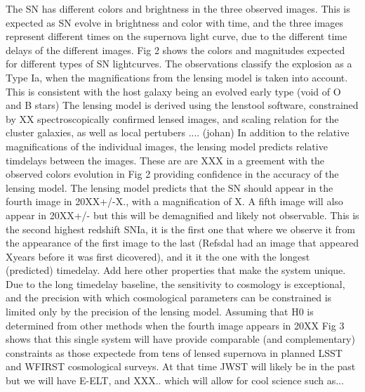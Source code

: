 \documentclass[fleqn,10pt]{wlscirep}
\begin{document}
The SN has different colors and brightness in the three observed images. This is expected as SN evolve in brightness and color with time, and the three images represent different times on the supernova light curve, due to the different time delays of the different images. Fig 2 shows the colors and magnitudes expected for different types of SN lightcurves. The observations classify the explosion as a Type Ia, when the magnifications from the lensing model is taken into account. This is consistent with the host galaxy being an evolved early type (void of O and B stars)
\newline
\newline
The lensing model is derived using the lenstool software, constrained by XX spectroscopically confirmed lensed images, and scaling relation for the cluster galaxies, as well as local pertubers .... (johan)
\newline
\newline
In addition to the relative magnifications of the individual images, the lensing model predicts relative timdelays between the images. These are are XXX in a greement with the observed colors evolution in Fig 2 providing confidence in the accuracy of the lensing model. The lensing model predicts that the SN should appear in the fourth image in 20XX+/-X., with a magnification of X. A fifth image will also appear in 20XX+/- but this will be demagnified and likely not observable.
\newline
\newline
This is the second highest redshift SNIa, it is the first one that where we observe it from the appearance of the first image to the last (Refsdal had an image that appeared Xyears before it was first dicovered), and it it the one with the longest (predicted) timedelay.  Add here other properties that make the system unique.
\newline
\newline
Due to the long timedelay baseline, the sensitivity to cosmology is exceptional, and the precision with which cosmological parameters can be constrained is limited only by the precision of the lensing model. Assuming that H0 is determined from other methods when the fourth image appears in 20XX Fig 3 shows that this single system will have provide comparable (and complementary) constraints as those expectede from tens of lensed supernova in planned LSST and WFIRST cosmological surveys. At that time JWST will likely be in the past but we will have E-ELT, and XXX.. which will allow for cool science such as...
\end{document}
